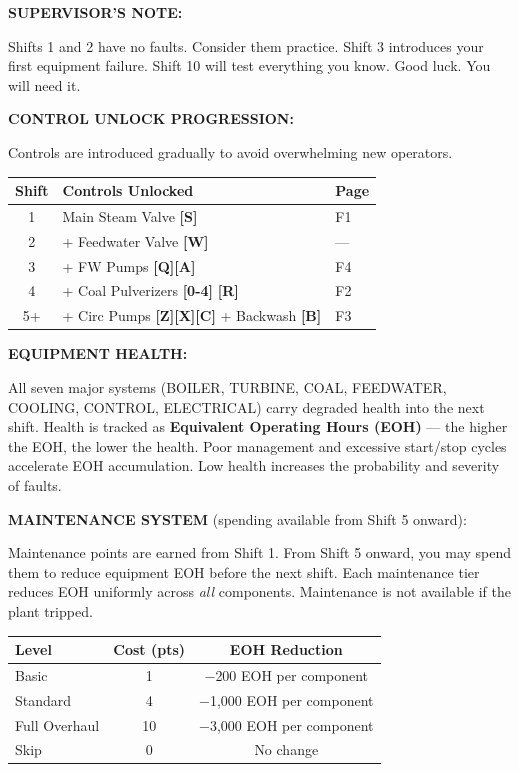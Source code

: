 \documentclass[10pt,a5paper]{article}
\newenvironment{notebox}{%
  \vspace{4pt}%
  \textbf{SUPERVISOR'S NOTE:} \bfseries%
}{%
}
\newcommand{\key}[1]{\textbf{[#1]}}
\begin{document}
\begin{notebox}
Shifts 1 and 2 have no faults. Consider them practice. Shift 3 introduces your
first equipment failure. Shift 10 will test everything you know. Good luck. You
will need it.
\end{notebox}

\textbf{\uppercase{Control Unlock Progression:}}

Controls are introduced gradually to avoid overwhelming new operators.

\begin{center}
\begin{tabular}{cll}
\toprule
\textbf{Shift} & \textbf{Controls Unlocked} & \textbf{Page} \\
\midrule
1   & Main Steam Valve \key{S}                                      & F1  \\
2   & + Feedwater Valve \key{W}                                     & —   \\
3   & + FW Pumps \key{Q}\key{A}                                     & F4  \\
4   & + Coal Pulverizers \key{0-4} \key{R}                         & F2  \\
5+  & + Circ Pumps \key{Z}\key{X}\key{C} + Backwash \key{B}        & F3  \\
\bottomrule
\end{tabular}
\end{center}

\newpage
\textbf{\uppercase{Equipment Health:}}

All seven major systems (BOILER, TURBINE, COAL, FEEDWATER, COOLING, CONTROL,
ELECTRICAL) carry degraded health into the next shift. Health is tracked as
\textbf{Equivalent Operating Hours (EOH)} --- the higher the EOH, the lower
the health. Poor management and excessive start/stop cycles accelerate EOH
accumulation. Low health increases the probability and severity of faults.

\textbf{\uppercase{Maintenance System}} (spending available from Shift 5 onward):

Maintenance points are earned from Shift 1. From Shift 5 onward, you may
spend them to reduce equipment EOH before the next shift. Each maintenance
tier reduces EOH uniformly across \textit{all} components. Maintenance is
not available if the plant tripped.

\begin{center}
\begin{tabular}{lcc}
\toprule
\textbf{Level} & \textbf{Cost (pts)} & \textbf{EOH Reduction} \\
\midrule
Basic          & 1  & $-$200 EOH per component  \\
Standard       & 4  & $-$1,000 EOH per component \\
Full Overhaul  & 10 & $-$3,000 EOH per component \\
Skip           & 0  & No change                 \\
\bottomrule
\end{tabular}
\end{center}
\end{document}
